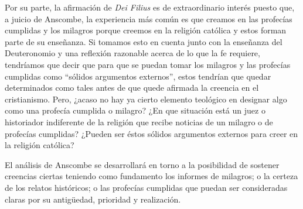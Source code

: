 Por su parte, la afirmación de \emph{Dei Filius} es de extraordinario interés
puesto que, a juicio de Anscombe, la experiencia más común es que creamos en las
profecías cumplidas y los milagros porque creemos en la religión católica y
estos forman parte de su enseñanza. Si tomamos esto en cuenta junto con la
enseñanza del Deuteronomio y una reflexión razonable acerca de lo que la fe
requiere, tendríamos que decir que para que se puedan tomar los milagros y las
profecías cumplidas como \enquote{sólidos argumentos externos}, estos tendrían
que quedar determinados como tales antes de que quede afirmada la creencia en el
cristianismo. Pero, ¿acaso no hay ya cierto elemento teológico en designar algo
como una profecía cumplida o milagro? ¿En que situación está un juez o
historiador indiferente de la religión que recibe noticias de un milagro o de
profecías cumplidas? ¿Pueden ser éstos sólidos argumentos externos para creer en
la religión católica?

El análisis de Anscombe se desarrollará en torno a la posibilidad de sostener
creencias ciertas teniendo como fundamento los informes de milagros; o la
certeza de los relatos históricos; o las profecías cumplidas que puedan ser
consideradas claras por su antigüedad, prioridad y realización.

